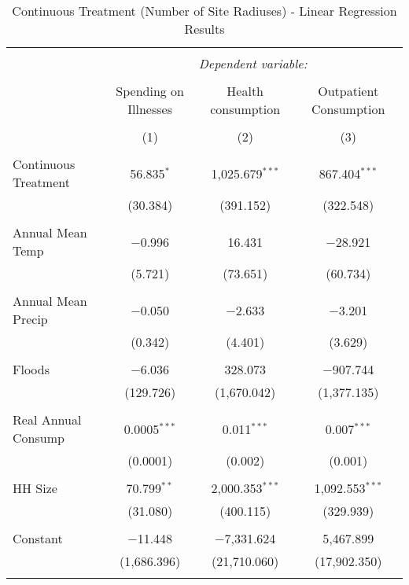 
\begin{table}[!htbp] \centering 
  \caption{Continuous Treatment (Number of Site Radiuses) - Linear Regression Results} 
  \label{} 
\begin{tabular}{@{\extracolsep{5pt}}lccc} 
\\[-1.8ex]\hline 
\hline \\[-1.8ex] 
 & \multicolumn{3}{c}{\textit{Dependent variable:}} \\ 
\cline{2-4} 
\\[-1.8ex] & Spending on Illnesses & Health consumption & Outpatient Consumption \\ 
\\[-1.8ex] & (1) & (2) & (3)\\ 
\hline \\[-1.8ex] 
 Continuous Treatment & 56.835$^{*}$ & 1,025.679$^{***}$ & 867.404$^{***}$ \\ 
  & (30.384) & (391.152) & (322.548) \\ 
  & & & \\ 
 Annual Mean Temp & $-$0.996 & 16.431 & $-$28.921 \\ 
  & (5.721) & (73.651) & (60.734) \\ 
  & & & \\ 
 Annual Mean Precip & $-$0.050 & $-$2.633 & $-$3.201 \\ 
  & (0.342) & (4.401) & (3.629) \\ 
  & & & \\ 
 Floods & $-$6.036 & 328.073 & $-$907.744 \\ 
  & (129.726) & (1,670.042) & (1,377.135) \\ 
  & & & \\ 
 Real Annual Consump & 0.0005$^{***}$ & 0.011$^{***}$ & 0.007$^{***}$ \\ 
  & (0.0001) & (0.002) & (0.001) \\ 
  & & & \\ 
 HH Size & 70.799$^{**}$ & 2,000.353$^{***}$ & 1,092.553$^{***}$ \\ 
  & (31.080) & (400.115) & (329.939) \\ 
  & & & \\ 
 Constant & $-$11.448 & $-$7,331.624 & 5,467.899 \\ 
  & (1,686.396) & (21,710.060) & (17,902.350) \\ 
  & & & \\ 

\end{tabular}
\end{table}
